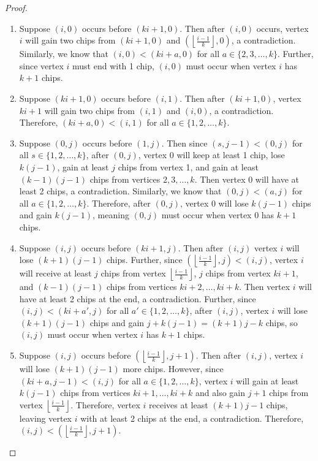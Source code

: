 \documentclass[10pt,a4paper]{amsart}
\begin{document}
\begin{proof}
\begin{enumerate}
    \item Suppose $(i,0)$ occurs before $(ki+1, 0)$. Then after $(i,0)$ occurs, vertex $i$ will gain two chips from $(ki+1, 0)$ and $\left ( \left \lfloor \frac {i-1} k \right \rfloor, 0 \right )$, a contradiction. Similarly, we know that $(i,0) < (ki+a,0)$ for all $a \in \{2, 3, \dots, k\}$. Further, since vertex $i$ must end with 1 chip, $(i,0)$ must occur when vertex $i$ has $k+1$ chips.

    \item Suppose $(ki+1,0)$ occurs before $(i,1)$. Then after $(ki+1, 0)$, vertex $ki+1$ will gain two chips from $(i,1)$ and $(i,0)$, a contradiction. Therefore, $(ki+a, 0) < (i, 1)$ for all $a \in \{1, 2, \dots, k\}$.

    \item Suppose $(0,j)$ occurs before $(1,j)$. Then since $(s,j-1)< (0,j)$ for all $s \in \{1,2, \dots, k\}$, after $(0,j)$, vertex 0 will keep at least 1 chip, lose $k(j-1)$, gain at least $j$ chips from vertex 1, and gain at least $(k-1)(j-1)$ chips from vertices $2, 3, \ldots, k$. Then vertex 0 will have at least 2 chips, a contradiction. Similarly, we know that $(0,j) < (a,j)$ for all $a \in \{1, 2, \dots, k\}$. Therefore, after $(0,j)$, vertex 0 will lose $k(j-1)$ chips and gain $k(j-1)$, meaning $(0,j)$ must occur when vertex 0 has $k+1$ chips.

    \item Suppose $(i,j)$ occurs before $(ki+1, j)$. Then after $(i,j)$ vertex $i$ will lose $(k+1)(j-1)$ chips. Further, since $\left ( \left \lfloor \frac {i-1} k \right \rfloor, j \right ) < (i,j)$, vertex $i$ will receive at least $j$ chips from vertex $\left \lfloor \frac {i-1} k \right \rfloor$, $j$ chips from vertex $ki+1$, and $(k-1)(j-1)$ chips from vertices $ki+2, \ldots, ki+k$. Then vertex $i$ will have at least 2 chips at the end, a contradiction. Further, since $(i,j) < (ki+a', j)$ for all $a' \in \{1,2, \dots, k\}$, after $(i,j)$, vertex $i$ will lose $(k+1)(j-1)$ chips and gain $j+k(j-1) = (k+1)j-k$ chips, so $(i,j)$ must occur when vertex $i$ has $k+1$ chips.

    \item Suppose $(i,j)$ occurs before $\left(\left \lfloor \frac {i-1} k \right \rfloor, j+1 \right)$. Then after $(i,j)$, vertex $i$ will lose $(k+1)(j-1)$ more chips. However, since $(ki+a, j-1) < (i,j)$ for all $a \in \{1, 2, \dots, k\}$, vertex $i$ will gain at least $k(j-1)$ chips from vertices $ki+1, \ldots, ki+k$ and also gain $j+1$ chips from vertex $\left \lfloor \frac {i-1} k \right \rfloor$. Therefore, vertex $i$ receives at least $(k+1)j-1$ chips, leaving vertex $i$ with at least 2 chips at the end, a contradiction. Therefore, $(i,j) < \left(\left \lfloor \frac {i-1} k \right \rfloor, j+1 \right).$
\end{enumerate}
\end{proof}
\end{document}

